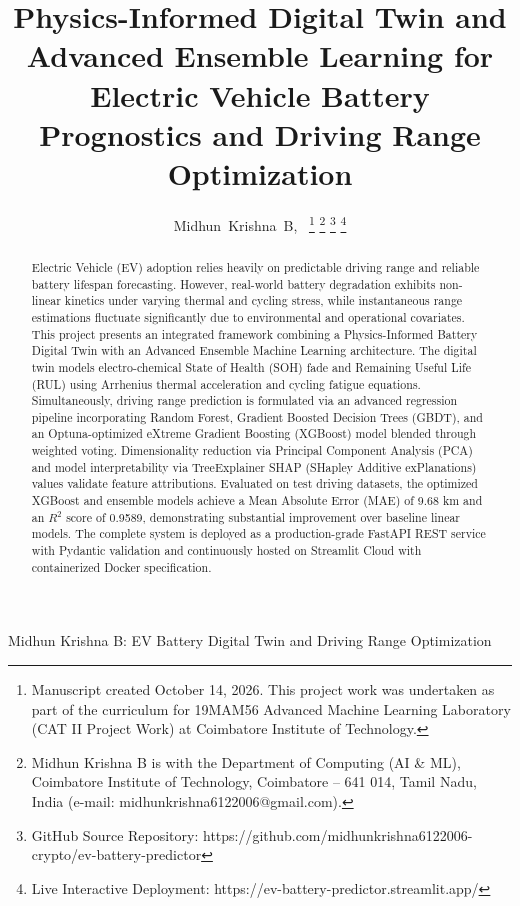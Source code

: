 \documentclass[journal]{IEEEtran}
\begin{document}
\title{Physics-Informed Digital Twin and Advanced Ensemble Learning for Electric Vehicle Battery Prognostics and Driving Range Optimization}

\author{Midhun~Krishna~B,~
\thanks{Manuscript created October 14, 2026. This project work was undertaken as part of the curriculum for 19MAM56 Advanced Machine Learning Laboratory (CAT II Project Work) at Coimbatore Institute of Technology.}%
\thanks{Midhun Krishna B is with the Department of Computing (AI \& ML), Coimbatore Institute of Technology, Coimbatore -- 641 014, Tamil Nadu, India (e-mail: midhunkrishna6122006@gmail.com).}%
\thanks{GitHub Source Repository: https://github.com/midhunkrishna6122006-crypto/ev-battery-predictor}%
\thanks{Live Interactive Deployment: https://ev-battery-predictor.streamlit.app/}}

%
{Midhun Krishna B: EV Battery Digital Twin and Driving Range Optimization}

\maketitle

\begin{abstract}
Electric Vehicle (EV) adoption relies heavily on predictable driving range and reliable battery lifespan forecasting. However, real-world battery degradation exhibits non-linear kinetics under varying thermal and cycling stress, while instantaneous range estimations fluctuate significantly due to environmental and operational covariates. This project presents an integrated framework combining a Physics-Informed Battery Digital Twin with an Advanced Ensemble Machine Learning architecture. The digital twin models electro-chemical State of Health (SOH) fade and Remaining Useful Life (RUL) using Arrhenius thermal acceleration and cycling fatigue equations. Simultaneously, driving range prediction is formulated via an advanced regression pipeline incorporating Random Forest, Gradient Boosted Decision Trees (GBDT), and an Optuna-optimized eXtreme Gradient Boosting (XGBoost) model blended through weighted voting. Dimensionality reduction via Principal Component Analysis (PCA) and model interpretability via TreeExplainer SHAP (SHapley Additive exPlanations) values validate feature attributions. Evaluated on test driving datasets, the optimized XGBoost and ensemble models achieve a Mean Absolute Error (MAE) of 9.68 km and an $R^2$ score of 0.9589, demonstrating substantial improvement over baseline linear models. The complete system is deployed as a production-grade FastAPI REST service with Pydantic validation and continuously hosted on Streamlit Cloud with containerized Docker specification.
\end{abstract}
\end{document}
